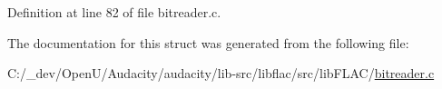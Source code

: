 Definition at line 82 of file bitreader.\+c.



The documentation for this struct was generated from the following file\+:\begin{DoxyCompactItemize}
\item 
C\+:/\+\_\+dev/\+Open\+U/\+Audacity/audacity/lib-\/src/libflac/src/lib\+F\+L\+A\+C/\hyperlink{bitreader_8c}{bitreader.\+c}\end{DoxyCompactItemize}
